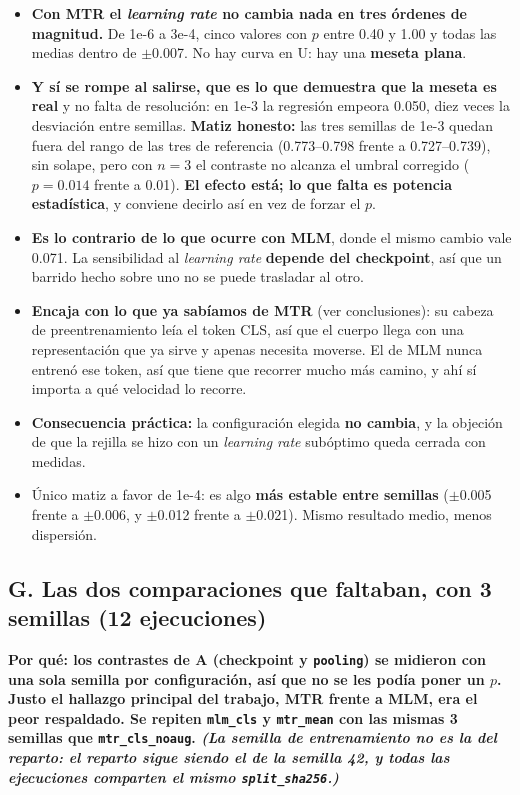 \documentclass[11pt,a4paper]{article}
\newcommand{\var}[1]{\texttt{#1}}
\newcommand{\exper}[2]{\subsection*{#1}\noindent\textbf{\small\textcolor{dtured}{#2}}\par\smallskip}
\begin{document}
\begin{concl}
\begin{itemize}
  \item \textbf{Con MTR el \emph{learning rate} no cambia nada en tres órdenes de magnitud.} De 1e-6 a
        3e-4, cinco valores con $p$ entre 0.40 y 1.00 y todas las medias dentro de $\pm$0.007. No hay
        curva en U: hay una \textbf{meseta plana}.
  \item \textbf{Y sí se rompe al salirse, que es lo que demuestra que la meseta es real} y no falta de
        resolución: en 1e-3 la regresión empeora 0.050, diez veces la desviación entre semillas.
        \textbf{Matiz honesto:} las tres semillas de 1e-3 quedan fuera del rango de las tres de
        referencia (0.773--0.798 frente a 0.727--0.739), sin solape, pero con $n=3$ el contraste no
        alcanza el umbral corregido ($p=0.014$ frente a 0.01). \textbf{El efecto está; lo que falta es
        potencia estadística}, y conviene decirlo así en vez de forzar el $p$.
  \item \textbf{Es lo contrario de lo que ocurre con MLM}, donde el mismo cambio vale 0.071. La
        sensibilidad al \emph{learning rate} \textbf{depende del checkpoint}, así que un barrido hecho
        sobre uno no se puede trasladar al otro.
  \item \textbf{Encaja con lo que ya sabíamos de MTR} (ver conclusiones): su cabeza de preentrenamiento
        leía el token CLS, así que el cuerpo llega con una representación que ya sirve y apenas
        necesita moverse. El de MLM nunca entrenó ese token, así que tiene que recorrer mucho más
        camino, y ahí sí importa a qué velocidad lo recorre.
  \item \textbf{Consecuencia práctica:} la configuración elegida \textbf{no cambia}, y la objeción de
        que la rejilla se hizo con un \emph{learning rate} subóptimo queda cerrada con medidas.
  \item Único matiz a favor de 1e-4: es algo \textbf{más estable entre semillas} ($\pm$0.005 frente a
        $\pm$0.006, y $\pm$0.012 frente a $\pm$0.021). Mismo resultado medio, menos dispersión.
\end{itemize}
\end{concl}

\exper{G. Las dos comparaciones que faltaban, con 3 semillas (12 ejecuciones)}
{Por qué: los contrastes de A (checkpoint y \var{pooling}) se midieron con \textbf{una sola semilla por configuración}, así que no se les podía poner un $p$. Justo el hallazgo principal del trabajo, MTR frente a MLM, era el peor respaldado. Se repiten \var{mlm\_cls} y \var{mtr\_mean} con las mismas 3 semillas que \var{mtr\_cls\_noaug}. \emph{(La semilla de entrenamiento no es la del reparto: el reparto sigue siendo el de la semilla 42, y todas las ejecuciones comparten el mismo \var{split\_sha256}.)}}
\end{document}
